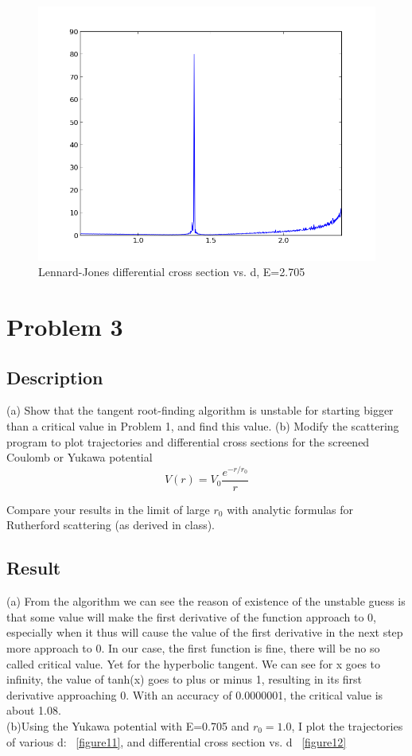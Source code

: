 \documentclass[11pt,letterpaper]{article}
\begin{document}
\begin{figure}
\begin{center}
\includegraphics[width=0.9\linewidth,angle=0]{p2diffE2705.png}
\caption{Lennard-Jones differential cross section vs. d, E=2.705}
\label{figure10}
\end{center}
\end{figure}

\newpage

\section{Problem 3}
\subsection{Description}
(a) Show that the tangent root-finding algorithm is unstable for starting   bigger than a critical value in Problem 1, and find this value. (b) Modify the scattering program to plot trajectories and differential cross sections for the screened Coulomb or Yukawa potential
$$
V(r)=V_0\frac{e^{-r/r_0}}{r}
$$

Compare your results in the limit of large $r_0$ with analytic formulas for Rutherford scattering (as derived in class).
\subsection{Result}
(a) From the algorithm we can see the reason of existence of the unstable guess is that some value will make the first derivative of the function approach to 0, especially when it thus will cause the value of the first derivative in the next step more approach to 0. In our case, the first function is fine, there will be no so called critical value. Yet for the hyperbolic tangent. We can see for x goes to infinity, the value of tanh(x) goes to plus or minus 1, resulting in its first derivative approaching 0. With an accuracy of 0.0000001, the critical value is about 1.08.   
\\
(b)Using the Yukawa potential with E=0.705 and $r_0=1.0$, I plot the trajectories of various d: ~\ref{figure11}, and differential cross section vs. d ~\ref{figure12}
\end{document}
